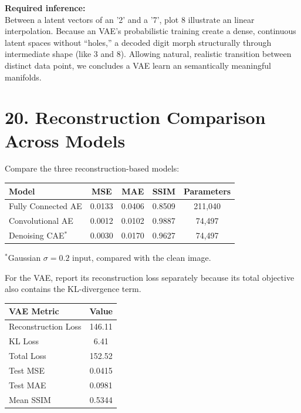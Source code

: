 \documentclass[10pt]{article}
\begin{document}
\textbf{Required inference:}\\
Between a latent vectors of an '2' and a '7', plot 8 illustrate an linear interpolation. Because an VAE's probabilistic training create a dense, continuous latent spaces without ``holes,'' a decoded digit morph structurally through intermediate shape (like 3 and 8). Allowing natural, realistic transition between distinct data point, we concludes a VAE learn an semantically meaningful manifolds.

\section*{20. Reconstruction Comparison Across Models}

Compare the three reconstruction-based models:

\begin{center}
\begin{tabular}{|l|c|c|c|c|}
\hline
Model & MSE & MAE & SSIM & Parameters\\
\hline
Fully Connected AE & 0.0133 & 0.0406 & 0.8509 & 211,040\\
Convolutional AE & 0.0012 & 0.0102 & 0.9887 & 74,497\\
Denoising CAE$^{*}$ & 0.0030 & 0.0170 & 0.9627 & 74,497\\
\hline
\end{tabular}

\vspace{1mm}
{\footnotesize $^{*}$Gaussian $\sigma=0.2$ input, compared with the clean image.}
\end{center}

For the VAE, report its reconstruction loss separately because its total
objective also contains the KL-divergence term.

\begin{center}
\begin{tabular}{|l|c|}
\hline
VAE Metric & Value\\
\hline
Reconstruction Loss & 146.11\\
KL Loss & 6.41\\
Total Loss & 152.52\\
Test MSE & 0.0415\\
Test MAE & 0.0981\\
Mean SSIM & 0.5344\\
\hline
\end{tabular}
\end{center}
\end{document}
